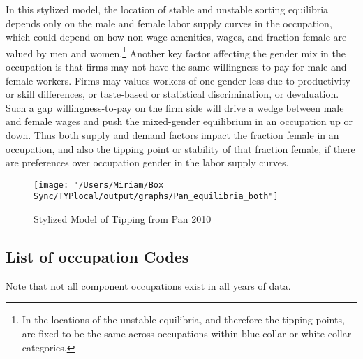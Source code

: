 \documentclass[11pt]{article}
\begin{document}

In this stylized model, the location of stable and unstable sorting equilibria depends only on the male and female labor supply curves in the occupation, which could depend on how non-wage amenities, wages, and fraction female are valued by men and women.\footnote{In  the locations of the unstable equilibria, and therefore the tipping points, are fixed to be the same across occupations within blue collar or white collar categories.} Another key factor affecting the gender mix in the occupation is that firms may not have the same willingness to pay for male and female workers. Firms may values workers of one gender less due to productivity or skill differences, or taste-based or statistical discrimination, or devaluation. Such a gap willingness-to-pay on the firm side will drive a wedge between male and female wages and push the mixed-gender equilibrium in an occupation up or down. Thus both supply and demand factors impact the fraction female in an occupation, and also the tipping point or stability of that fraction female, if there are preferences over occupation gender in the labor supply curves.

\begin{figure}[H]
\centering
\caption{Stylized Model of Tipping from Pan 2010}
\label{fig:tipping}
\texttt{[image: "/Users/Miriam/Box Sync/TYPlocal/output/graphs/Pan\_equilibria\_both"]}
\end{figure}


\subsection{List of occupation Codes} \label{occupations}

Note that not all component occupations exist in all years of data. 

%
\end{document}
